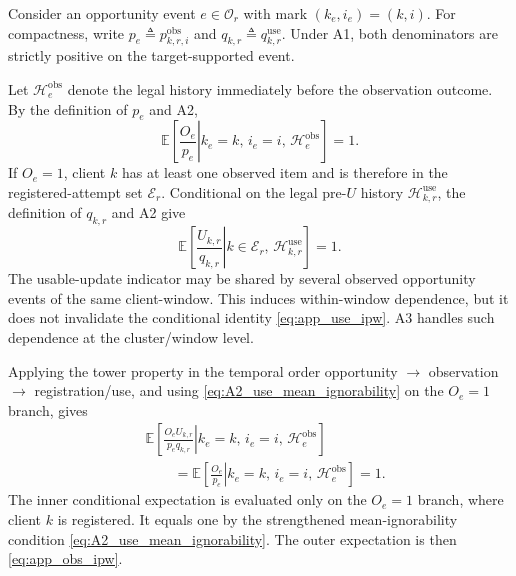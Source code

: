 Consider an opportunity event $e\in\mathcal{O}_r$ with mark
$(k_e,i_e)=(k,i)$.  For compactness, write
$p_e\triangleq p^{\mathrm{obs}}_{k,r,i}$ and
$q_{k,r}\triangleq q^{\mathrm{use}}_{k,r}$.
Under A1, both denominators are strictly positive on the target-supported event.

Let $\mathcal{H}^{\mathrm{obs}}_e$ denote the legal history immediately before
the observation outcome.  By the definition of $p_e$ and A2,
\begin{equation}
    \mathbb{E}
    \left[
    \left.
    \frac{O_e}{p_e}
    \right|
    k_e=k,\,
    i_e=i,\,
    \mathcal{H}^{\mathrm{obs}}_e
    \right]
    =1.
    \label{eq:app_obs_ipw}
\end{equation}
If $O_e=1$, client $k$ has at least one observed item and is therefore in the
registered-attempt set $\mathcal{E}_r$.  Conditional on the legal pre-$U$
history $\mathcal{H}^{\mathrm{use}}_{k,r}$, the definition of $q_{k,r}$ and A2
give
\begin{equation}
    \mathbb{E}
    \left[
    \left.
    \frac{U_{k,r}}{q_{k,r}}
    \right|
    k\in\mathcal{E}_r,\,
    \mathcal{H}^{\mathrm{use}}_{k,r}
    \right]
    =1.
    \label{eq:app_use_ipw}
\end{equation}
The usable-update indicator may be shared by several observed opportunity
events of the same client-window.  This induces within-window dependence, but
it does not invalidate the conditional identity
\eqref{eq:app_use_ipw}.  A3 handles such dependence at the
cluster/window level.

Applying the tower property in the temporal order
opportunity $\rightarrow$ observation $\rightarrow$ registration/use, and using
\eqref{eq:A2_use_mean_ignorability} on the $O_e=1$ branch, gives
\begin{align}
 &\mathbb{E}\!\left[
 \left.
 \frac{O_eU_{k,r}}{p_eq_{k,r}}
 \right|
 k_e=k,\,i_e=i,\,\mathcal{H}^{\mathrm{obs}}_e
 \right]
 \nonumber\\
 &\qquad=
 \mathbb{E}\!\left[
 \left.
 \frac{O_e}{p_e}
 \right|
 k_e=k,\,i_e=i,\,\mathcal{H}^{\mathrm{obs}}_e
 \right]
 =1.
 \label{eq:app_sequential_identity}
\end{align}
The inner conditional expectation is evaluated only on the $O_e=1$ branch,
where client $k$ is registered.  It equals one by the strengthened
mean-ignorability condition \eqref{eq:A2_use_mean_ignorability}.  The outer
expectation is then \eqref{eq:app_obs_ipw}.

